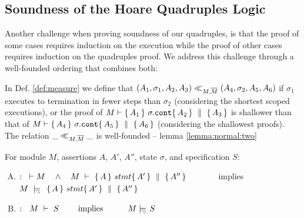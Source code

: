 
\subsection{ Soundness of the Hoare Quadruples Logic}

Another challenge when proving soundness of our quadruples, is that the proof of some cases  requires induction on the execution while the proof of other cases  requires induction on the quadruples
proof.  We address this challenge  through  a well-founded ordering that combines both:


\label{sect:prove:wellfounded}
\label{sect:prove:sound:quadruples}

In Def.  \ref{def:measure}  we define that $(A_1,\sigma_1,A_2, A_3) \ll_{M,\overline{M}}  (A_4,\sigma_2,A_5, A_6)$ if $\sigma_1$ executes to termination  in fewer steps than $\sigma_2$ (considering the shortest scoped executions), or  the proof of $M \vdash  \{\, A_1 \, \}\ \sigma.\mbox{\normalfont{\texttt{cont}}} \{\, A_2 \, \} \, \,\parallel\,\, \{\, A_3 \, \}  $
is shallower than that of  $M \vdash  \{\, A_4 \, \}\ \sigma.\mbox{\normalfont{\texttt{cont}}} \{\, A_5 \, \} \, \,\parallel\,\, \{\, A_6 \, \}  $ (considering the shallowest proofs).  
The relation $\_ \ll_{M,\overline{M}}  \_$  is well-founded -- \cf lemma \ref{lemma:normal:two}
 

\begin{theorem}
\label{t:quadruple:sound}
\label{thm:soundness}
For module  $M$,   assertions $A$, $A'$, $A''$,   state  $\sigma$, and specification $S$:

\begin{enumerate}[(A)]
\item
 $:\strut \   \vdash M  \ \ \ \wedge \ \ \  M\ \vdash\  \quadruple {A} {stmt} {A'} {A''}$ \ \ \ \ \ \ \ \mbox{implies}\ \ \ \ \ \  \ \ \ $M\ \modelsD\  \quadruple {A} {stmt} {A'} {A''}$
 \item
  $:\strut \  \  \proves{M}{S}\ \ \ \ \ \ \ \mbox{implies}\ \ \ \ \ \  \ \ \ {M} \modelsD {S}$
 
\end{enumerate}

\end{theorem}

